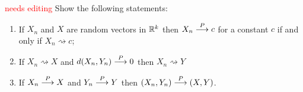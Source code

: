 \begin{shaded}
\begin{exercise}
\textcolor{red}{needs editing}
 Show the following statements:
\begin{enumerate}
\item If $X_n$ and $X$ are random vectors in $\Bbb R^k$ then $X_n\overset{\small P} \longrightarrow c$ for a constant $c$ if and only if $X_n\rightsquigarrow c$;
\item If $X_n\rightsquigarrow X$ and $d(X_n, Y_n)\overset{\small P} \longrightarrow 0$ then $X_n\rightsquigarrow Y$
\item If  $X_n \overset{\small P} \longrightarrow X$ and  $Y_n \overset{\small P} \longrightarrow Y$ then $(X_n,Y_n)\overset{\small P} \longrightarrow (X,Y)$. 
\end{enumerate}
\end{exercise}




\end{shaded}



